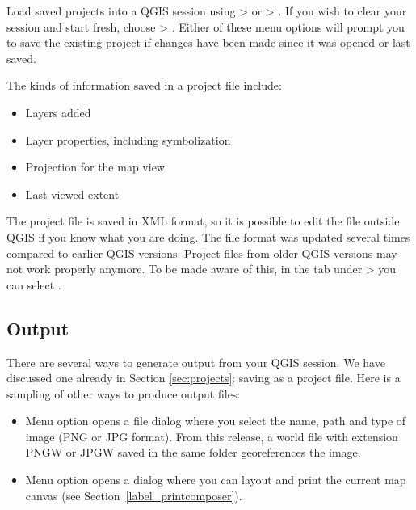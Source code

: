 Load saved projects into a QGIS session using 
 > 
or  > .
If you wish to clear your session and start fresh, choose
 > .
Either of these menu options will prompt you to save the existing project
if changes have been made since it was opened or last saved.

The kinds of information saved in a project file include:

\begin{itemize}
\item Layers added
\item Layer properties, including symbolization
\item Projection for the map view
\item Last viewed extent
\end{itemize}

The project file is saved in XML format, so it is possible to edit
the file outside QGIS if you know what you are doing. The file format 
was updated several times compared to earlier QGIS versions. Project files 
from older QGIS versions may not work properly anymore. To be made aware of this, 
in the  tab under  >  
you can select .

\subsection{Output}\label{sec:output}
There are several ways to generate output from your QGIS session.
We have discussed one already in Section \ref{sec:projects}: saving as a project file. 
Here is a sampling of other ways to produce output files:
\begin{itemize}
\item Menu option  opens a
file dialog where you select the name, path and type of image (PNG or JPG format). From this
release, a world file with extension PNGW or JPGW saved in the same folder georeferences the image.
\item Menu option  opens a dialog 
where you can layout and print the current map canvas (see Section~\ref{label_printcomposer}).
\end{itemize}



